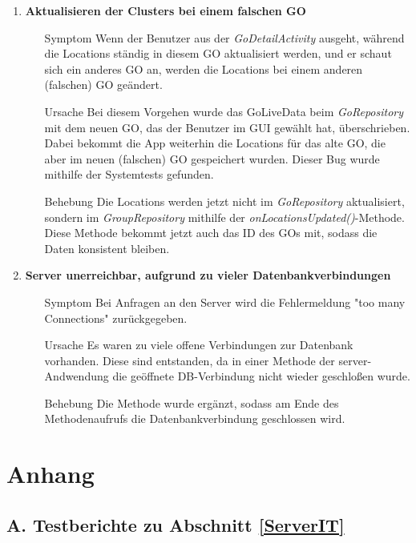 \documentclass[11pt,a4paper]{scrartcl}
\def\threedigits#1{%
  \ifnum#1<100 0\fi
  \ifnum#1<10 0\fi
  \number#1}
\begin{document}
\begin{enumerate}[label={\textbf{/B\protect\threedigits{\theenumi}0/}}, leftmargin=*]
\item \textbf{Aktualisieren der Clusters bei einem falschen GO}
	\begin{itemize}
		\item[Symptom] Wenn der Benutzer aus der \textit{GoDetailActivity} ausgeht, während die Locations ständig in diesem GO aktualisiert werden, und er schaut sich ein anderes GO an, werden die Locations bei einem anderen (falschen) GO geändert.
		\item[Ursache] Bei diesem Vorgehen wurde das GoLiveData beim \textit{GoRepository} mit dem neuen GO, das der Benutzer im GUI gewählt hat, überschrieben. Dabei bekommt die App weiterhin die Locations für das alte GO, die aber im neuen (falschen) GO gespeichert wurden. Dieser Bug wurde mithilfe der Systemtests gefunden.
		\item[Behebung] Die Locations werden jetzt nicht im \textit{GoRepository} aktualisiert, sondern im \textit{GroupRepository} mithilfe der \textit{onLocationsUpdated()}-Methode. Diese Methode bekommt jetzt auch das ID des GOs mit, sodass die Daten konsistent bleiben.
	\end{itemize}
	
\item \textbf{Server unerreichbar, aufgrund zu vieler Datenbankverbindungen}
	\begin{itemize}
		\item[Symptom] Bei Anfragen an den Server wird die Fehlermeldung "too many Connections" zurückgegeben.
		\item[Ursache] Es waren zu viele offene Verbindungen zur Datenbank vorhanden. Diese sind entstanden, da in einer Methode der server-Andwendung die geöffnete DB-Verbindung nicht wieder geschloßen wurde.
		\item[Behebung] Die Methode wurde ergänzt, sodass am Ende des Methodenaufrufs die Datenbankverbindung geschlossen wird.
	\end{itemize}

\end{enumerate}

\newpage

\section{Anhang}

\subsection{A. Testberichte zu Abschnitt \ref{ServerIT}}
\end{document}
